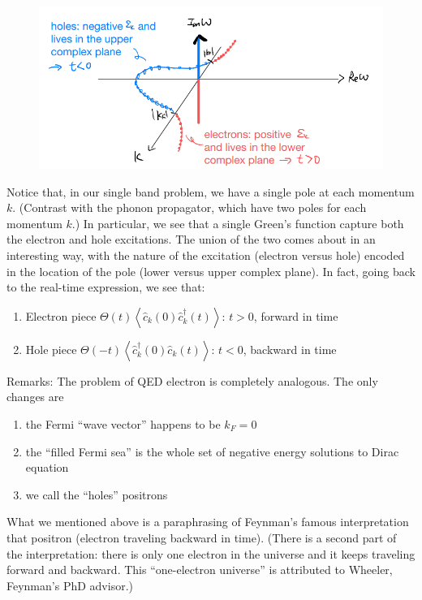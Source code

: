 \begin{figure}[ht]
    \centering
    \includegraphics[width=\textwidth]{jupyterbook/data/fig/lec15-fig01.png}
\end{figure}

Notice that, in our single band problem, we have a single pole at each momentum $k$. (Contrast with the phonon propagator, which have two poles for each momentum $k$.) In particular, we see that a single Green's function capture both the electron and hole excitations. The union of the two comes about in an interesting way, with the nature of the excitation (electron versus hole) encoded in the location of the pole (lower versus upper complex plane). In fact, going back to the real-time expression, we see that:
\begin{enumerate}
    \item Electron piece $\Theta \left( t \right) \left< \hat{c}_k\left( 0 \right) \hat{c}_{k}^{\dagger}\left( t \right) \right> $: $t>0$, forward in time
    \item Hole piece $\Theta \left( -t \right) \left< \hat{c}_{k}^{\dagger}\left( 0 \right) \hat{c}_k\left( t \right) \right> $: $t<0$, backward in time
\end{enumerate}

Remarks: The problem of QED electron is completely analogous. The only changes are
\begin{enumerate}
    \item the Fermi ``wave vector'' happens to be $k_F=0$
    \item the ``filled Fermi sea'' is the whole set of negative energy solutions to Dirac equation
    \item we call the ``holes'' positrons
\end{enumerate}
What we mentioned above is a paraphrasing of Feynman's famous interpretation that positron (electron traveling backward in time). (There is a second part of the interpretation: there is only one electron in the universe and it keeps traveling forward and backward. This ``one-electron universe'' is attributed to Wheeler, Feynman's PhD advisor.)

